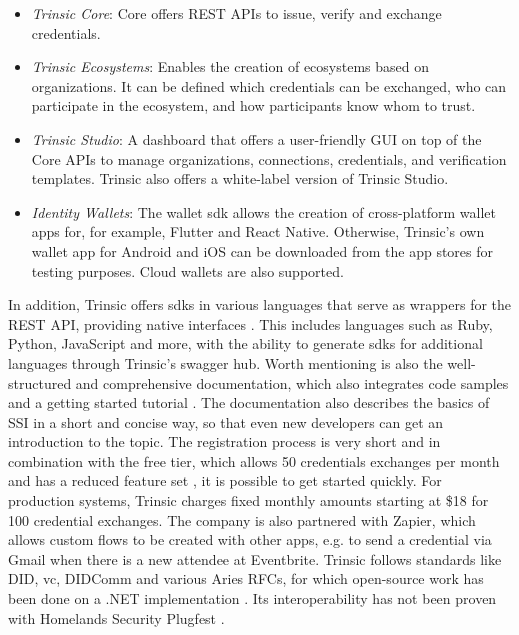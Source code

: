     \begin{itemize}
        \item \textit{Trinsic Core}: Core offers REST APIs to issue, verify and exchange credentials. \cite{trinsic_trinsic_2021-1}
        \item \textit{Trinsic Ecosystems}: Enables the creation of ecosystems based on organizations. It can be defined which credentials can be exchanged, who can participate in the ecosystem, and how participants know whom to trust. \cite{trinsic_trinsic_2021-2}
        \item \textit{Trinsic Studio}: A dashboard that offers a user-friendly GUI on top of the Core APIs to manage organizations, connections, credentials, and verification templates. Trinsic also offers a white-label version of Trinsic Studio. \cite{trinsic_trinsic_2021-3}
        \item \textit{Identity Wallets}: The wallet \ac{sdk} allows the creation of cross-platform wallet apps for, for example, Flutter and React Native. Otherwise, Trinsic's own wallet app for Android and iOS can be downloaded from the app stores for testing purposes. Cloud wallets are also supported. \cite{trinsic_identity_2021}
    \end{itemize}
    
    In addition, Trinsic offers \acp{sdk} in various languages that serve as wrappers for the REST API, providing native interfaces \cite{trinsic_service_2021}. This includes languages such as Ruby, Python, JavaScript and more, with the ability to generate \acp{sdk} for additional languages through Trinsic's swagger hub. Worth mentioning is also the well-structured and comprehensive documentation, which also integrates code samples and a getting started tutorial \cite{trinsic_introduction_2021}. The documentation also describes the basics of \ac{SSI} in a short and concise way, so that even new developers can get an introduction to the topic. The registration process is very short and in combination with the free tier, which allows 50 credentials exchanges per month and has a reduced feature set \cite{trinsic_pricing_2021}, it is possible to get started quickly. For production systems, Trinsic charges fixed monthly amounts starting at \$18 for 100 credential exchanges. The company is also partnered with Zapier, which allows custom flows to be created with other apps, e.g. to send a credential via Gmail when there is a new attendee at Eventbrite. Trinsic follows standards like \ac{DID}, \ac{vc}, DIDComm and various Aries \acp{RFC}, for which open-source work has been done on a .NET implementation \cite{trinsic_open_2021}. Its interoperability has not been proven with Homelands Security Plugfest \cite{homeland_security_interoperability_2021}.
  
